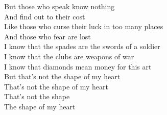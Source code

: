 \begin{flushleft}
But those who speak know nothing\\
And find out to their cost\\
Like those who curse their luck in too many places\\
And those who fear are lost\\
\hops
\hspace{0.9cm}I know that the spades are the swords of a soldier\\
\hspace{0.9cm}I know that the clubs are weapons of war\\
\hspace{0.9cm}I know that diamonds mean money for this art\\
\hspace{0.9cm}But that's not the shape of my heart\\
\hspace{0.9cm}That's not the shape of my heart\\
\hspace{0.9cm}That's not the shape\\
\hspace{0.9cm}The shape of my heart
\end{flushleft}
\newpage